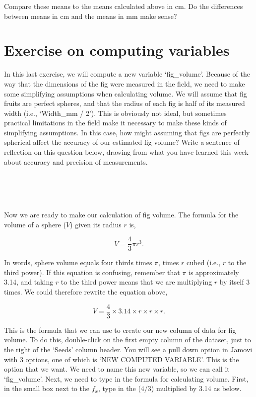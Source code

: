 \documentclass[
]{scrbook}
\begin{document}
Compare these means to the means calculated above in cm.
Do the differences between means in cm and the means in mm make sense?

\hypertarget{computing_variables_02}{%
\section{Exercise on computing variables}\label{computing_variables_02}}

In this last exercise, we will compute a new variable `fig\_volume'.
Because of the way that the dimensions of the fig were measured in the field, we need to make some simplifying assumptions when calculating volume.
We will assume that fig fruits are perfect spheres, and that the radius of each fig is half of its measured width (i.e., `Width\_mm / 2').
This is obviously not ideal, but sometimes practical limitations in the field make it necessary to make these kinds of simplifying assumptions.
In this case, how might assuming that figs are perfectly spherical affect the accuracy of our estimated fig volume?
Write a sentence of reflection on this question below, drawing from what you have learned this week about accuracy and precision of measurements.

\begin{verbatim}




\end{verbatim}

Now we are ready to make our calculation of fig volume.
The formula for the volume of a sphere (\(V\)) given its radius \(r\) is,

\[V = \frac{4}{3} \pi r^{3}.\]

In words, sphere volume equals four thirds times \(\pi\), times \(r\) cubed (i.e., \(r\) to the third power).
If this equation is confusing, remember that \(\pi\) is approximately 3.14, and taking \(r\) to the third power means that we are multiplying \(r\) by itself 3 times.
We could therefore rewrite the equation above,

\[V = \frac{4}{3} \times 3.14 \times r \times r \times r.\]

This is the formula that we can use to create our new column of data for fig volume.
To do this, double-click on the first empty column of the dataset, just to the right of the `Seeds' column header.
You will see a pull down option in Jamovi with 3 options, one of which is `NEW COMPUTED VARIABLE'.
This is the option that we want.
We need to name this new variable, so we can call it `fig\_volume'.
Next, we need to type in the formula for calculating volume.
First, in the small box next to the \(f_{x}\), type in the (4/3) multiplied by 3.14 as below.
\end{document}
